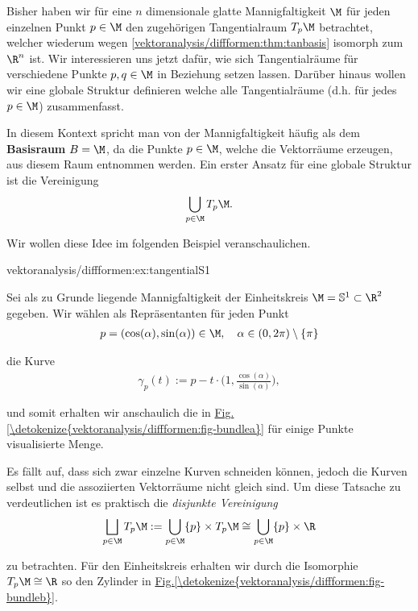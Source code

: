 \documentclass[letterpaper,10pt,english]{jupyterBook}
\begin{document}
\par
Bisher haben wir für eine \(n\) dimensionale glatte Mannigfaltigkeit \(\M\) für jeden einzelnen Punkt \(p\in\M\) den zugehörigen Tangentialraum \(T_p\M\) betrachtet, welcher wiederum wegen \cref{vektoranalysis/diffformen:thm:tanbasis} isomorph zum \(\R^n\) ist.
Wir interessieren uns jetzt dafür, wie sich Tangentialräume für verschiedene Punkte \(p,q\in \M\) in Beziehung setzen lassen.
Darüber hinaus wollen wir eine globale Struktur definieren welche alle Tangentialräume (d.h. für jedes \(p\in\M\)) zusammenfasst.

\par
In diesem Kontext spricht man von der Mannigfaltigkeit häufig als dem \textbf{Basisraum} \(B=\M\), da die Punkte \(p \in \M\), welche die Vektorräume erzeugen, aus diesem Raum entnommen werden.
Ein erster Ansatz für eine globale Struktur ist die Vereinigung
\begin{align*}
\bigcup_{p\in\M} T_p\M.
\end{align*}
\par
Wir wollen diese Idee im folgenden Beispiel veranschaulichen.
\begin{example}{}{vektoranalysis/diffformen:ex:tangentialS1}



\par
Sei als zu Grunde liegende Mannigfaltigkeit der Einheitskreis \(\M = \mathbb{S}^1\subset\R^2\) gegeben.
Wir wählen als Repräsentanten für jeden Punkt
\begin{align*}
p=(\cos(\alpha), \sin(\alpha))\in\M, \quad \alpha\in (0,2\pi) \setminus \{\pi\}
\end{align*}
\par
die Kurve
\begin{align*}
\gamma_p(t) := p - t \cdot\big(1, \frac{\cos(\alpha)}{\sin(\alpha)}\big),
\end{align*}
\par
und somit erhalten wir anschaulich die in \hyperref[\detokenize{vektoranalysis/diffformen:fig-bundlea}]{Fig.\@ \ref{\detokenize{vektoranalysis/diffformen:fig-bundlea}}} für einige Punkte visualisierte Menge.

\par
Es fällt auf, dass sich zwar einzelne Kurven schneiden können, jedoch die Kurven selbst und die assoziierten Vektorräume nicht gleich sind.
Um diese Tatsache zu verdeutlichen ist es praktisch die \emph{disjunkte Vereinigung}
\begin{align*}
\bigsqcup_{p\in\M} T_p\M := \bigcup_{p\in\M} \{p\} \times T_p\M \cong \bigcup_{p\in\M} \{p\} \times \R
\end{align*}
\par
zu betrachten.
Für den Einheitskreis erhalten wir durch die Isomorphie \(T_p\M \cong \R\) so den Zylinder in \hyperref[\detokenize{vektoranalysis/diffformen:fig-bundleb}]{Fig.\@ \ref{\detokenize{vektoranalysis/diffformen:fig-bundleb}}}.
\end{example}
\end{document}
